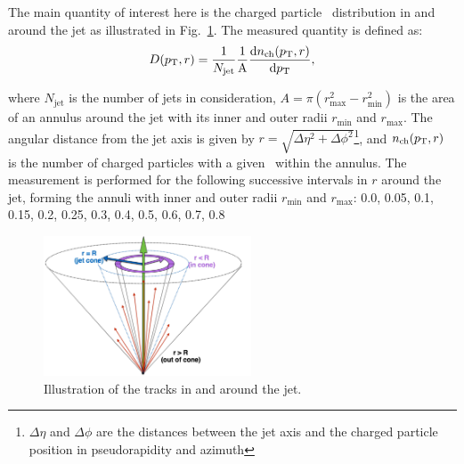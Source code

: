 
The main quantity of interest here is the charged particle \pt\ distribution in and around the jet as illustrated in Fig.~\ref{Fig:dpt_def}. The measured quantity is defined as:
  \begin{equation}
  \mbox{$D( p_{\mathrm{T}}, r)$} = \frac{1}{N_{\mathrm{jet}}} \frac{1}{\mathrm{A}} \frac{\mathrm{d} n_{\mathrm{ch}} (p_{\mathrm{T}}, r)}{\mathrm{d} p_{\mathrm{T}}},
\end{equation}

where $N_{\mathrm{jet}}$ is the number of jets in consideration, $A = \pi (r_{\mathrm{max}}^2 - r_{\mathrm{min}}^2) $ is the area of an annulus around the jet with its inner and outer radii $r_{\mathrm{min}}$ and $r_{\mathrm{max}}$. The angular distance from the jet axis is given by $r = \sqrt{\Delta \eta^2 + \Delta \phi^2}$\footnote{$\Delta \eta$ and $\Delta \phi$ are the distances between the jet axis and the charged particle position in pseudorapidity and azimuth}, and $n_{\mathrm{ch}}(p_{\mathrm{T}}, r)$ is the number of charged particles with a given \pt\ within the annulus. The measurement is performed for the following successive intervals in $r$ around the jet, forming the annuli with inner and outer radii $r_{\textrm{min}}$ and $r_{\textrm{max}}$: 0.0, 0.05, 0.1, 0.15, 0.2, 0.25, 0.3, 0.4, 0.5, 0.6, 0.7, 0.8

\begin{figure}
\centerline{
\includegraphics[width=0.55\textwidth]{figures_general/fragScheme_Shape.pdf} }
\caption{Illustration of the tracks in and around the jet. }
\label{Fig:dpt_def}
\end{figure}


